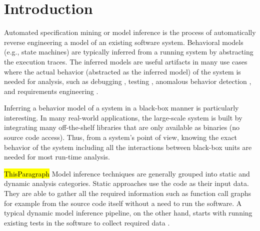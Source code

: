 \chapter{Introduction}
\label{sec:intro}
Automated specification mining or model inference \cite{lo2011mining} is the process of automatically reverse engineering a model of an existing software system. Behavioral models (e.g., state machines) are typically inferred from a running system by abstracting the execution traces. The inferred models are useful artifacts in many use cases where the actual behavior (abstracted as the inferred model) of the system is needed for analysis, such as debugging \cite{hybriddebugging, shang2013assisting, jafar2019interactive}, testing \cite{Walkinshaw2018TestingBlackBox, ModelBasedTesting, Papadopoulos2015, dallmeier2011automatically}, anomalous behavior detection \cite{valdes2000adaptive}, and requirements engineering \cite{damas2005generating}. 

Inferring a behavior model of a system in a black-box manner is particularly interesting. In many real-world applications, the large-scale system is built by integrating many off-the-shelf libraries that are only available as binaries (no source code access). Thus, from a system's point of view, knowing the exact behavior of the system including all the interactions between black-box units are needed for most run-time analysis. 

\hl{ThisParagraph}
Model inference techniques are generally grouped into static and dynamic analysis categories. 
Static approaches use the code as their input data. They are able to gather all the required information such as function call graphs for example from the source code itself without a need to run the software.
A typical dynamic model inference pipeline, on the other hand, starts with running existing tests in the software to collect required data \cite{Papadopoulos2015}.



